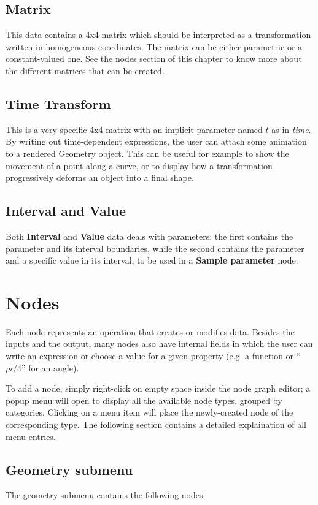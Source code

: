 \subsection{Matrix}
This data contains a 4x4 matrix which should be interpreted as a transformation written in
homogeneous coordinates. The matrix can be either parametric or a constant-valued one.
See the nodes section of this chapter to know more about the different matrices that can
be created.

\subsection{Time Transform}
This is a very specific 4x4 matrix with an implicit parameter named $t$ as in \textit{time}.
By writing out time-dependent expressions, the user can attach some animation to 
a rendered Geometry object. This can be useful for example to show the movement of a
point along a curve, or to display how a transformation progressively deforms an object
into a final shape.

\subsection{Interval and Value}
Both \textbf{Interval} and \textbf{Value} data deals with parameters: the first contains
the parameter and its interval boundaries, while the second contains the parameter and
a specific value in its interval, to be used in a \textbf{Sample parameter} node.

\section{Nodes}

Each node represents an operation that creates or modifies data. Besides the inputs and
the output, many nodes also have internal fields in which the user can write an expression
or choose a value for a given property (e.g. a function or ``$pi/4$'' for an angle).

To add a node, simply right-click on empty space inside the node graph editor;
a popup menu will open to display all the available node types, grouped by categories.
Clicking on a menu item will place the newly-created node of the corresponding type.
The following section contains a detailed explaination of all menu entries.

\subsection{Geometry submenu}
The geometry submenu contains the following nodes:

